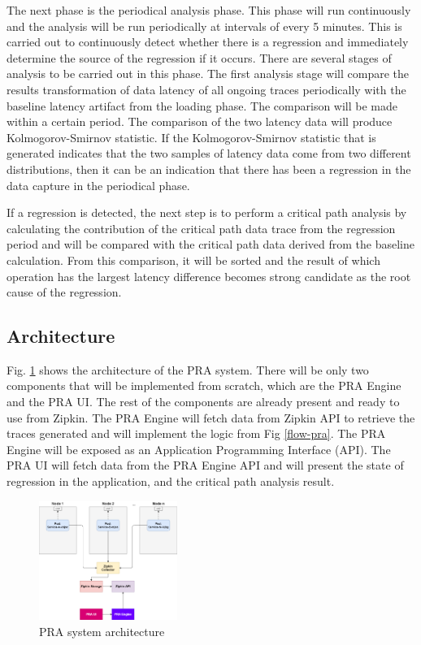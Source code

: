 \documentclass[conference]{configs/IEEEtran}
\begin{document}
The next phase is the periodical analysis phase. This phase will run continuously and the analysis will be run periodically at intervals of every 5 minutes. This is carried out to continuously detect whether there is a regression and
immediately determine the source of the regression if it occurs. There are several stages of analysis
to be carried out in this phase. The first analysis stage will compare the results transformation of data latency of all ongoing traces periodically with the baseline latency artifact from the loading phase. The comparison will be made within a certain period. The comparison of the two latency data will produce Kolmogorov-Smirnov statistic. If the Kolmogorov-Smirnov statistic that is generated indicates that the two samples of latency data come from two different distributions, then it can be an indication that there has been a regression in the data capture in the periodical phase.

If a regression is detected, the next step is to perform a critical path analysis by calculating the contribution of the critical path data trace from the regression period and will be compared with the critical path data derived from the baseline calculation. From this comparison, it will be sorted and the result of which operation has the largest latency difference becomes strong candidate as the root cause of the regression.

\subsection{Architecture}
Fig. \ref{arch-pra} shows the architecture of the PRA system. There will be only two components that will be implemented from scratch, which are the PRA Engine and the PRA UI. The rest of the components are already present and ready to use from Zipkin. The PRA Engine will fetch data from Zipkin API to retrieve the traces generated and will implement the logic from Fig \ref{flow-pra}. The PRA Engine will be exposed as an Application Programming Interface (API). The PRA UI will fetch data from the PRA Engine API and will present the state of regression in the application, and the critical path analysis result.
\begin{figure}[!htb]
	\centering
	\includegraphics[width=0.4\textwidth]{resources/ch3/arch.png}
	\caption{PRA system architecture}
	\label{arch-pra}
\end{figure}
\end{document}
